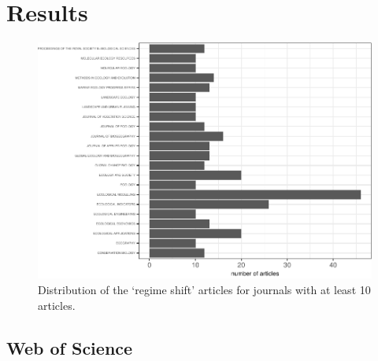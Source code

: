 \documentclass[12pt,twoside,openany]{reedthesis}
\begin{document}
\section{Results}\label{results}
\begin{figure}
\centering
\includegraphics{_myDissertation_files/figure-latex/wosRegimePubsByJrnlmin10Pubs-1.pdf}
\caption{\label{fig:wosRegimePubsByJrnlmin10Pubs}Distribution of the `regime
shift' articles for journals with at least 10 articles.}
\end{figure}
\subsection{Web of Science}\label{web-of-science-1}
\end{document}

